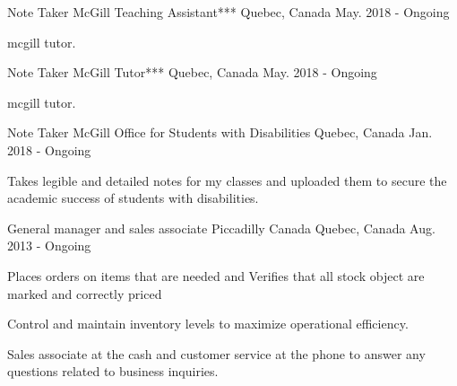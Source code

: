 \begin{cventries}
  \cventry
    {Note Taker}
    {McGill Teaching Assistant***}
    {Quebec, Canada}
    {May. 2018 - Ongoing}
    {
      \begin{cvitems}
        \item {mcgill tutor.}
      \end{cvitems}
    }
    \cventry
    {Note Taker}
    {McGill Tutor***}
    {Quebec, Canada}
    {May. 2018 - Ongoing}
    {
      \begin{cvitems}
        \item {mcgill tutor.}
      \end{cvitems}
    }
    \cventry
    {Note Taker}
    {McGill Office for Students with Disabilities }
    {Quebec, Canada}
    {Jan. 2018 - Ongoing}
    {
      \begin{cvitems}
        \item {Takes legible and detailed notes for my classes and uploaded them to secure the academic success of students with disabilities.}
      \end{cvitems}
    }
  \cventry
    {General manager and sales associate}
    {Piccadilly Canada}
    {Quebec, Canada}
    {Aug. 2013 - Ongoing}
    {
      \begin{cvitems}
        \item {Places orders on items that are needed and Verifies that all stock object are marked and correctly priced}
        \item {Control and maintain inventory levels to maximize operational efficiency.}
        \item {Sales associate at the cash and customer service at the phone to answer any questions related to business inquiries.}
      \end{cvitems}
    }
\end{cventries}
